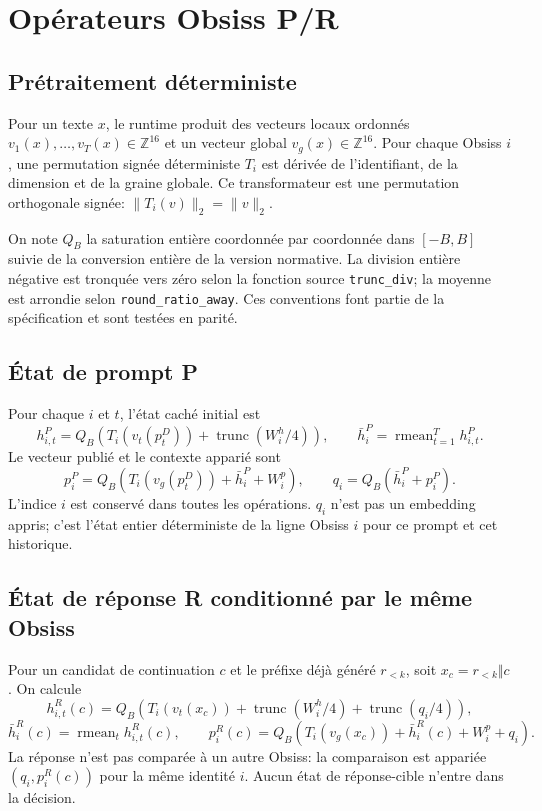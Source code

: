 \documentclass[11pt,a4paper]{report}
\begin{document}
\chapter{Opérateurs Obsiss P/R}
\section{Prétraitement déterministe}
Pour un texte $x$, le runtime produit des vecteurs locaux ordonnés $v_1(x),\ldots,v_T(x)\in\mathbb Z^{16}$ et un vecteur global $v_g(x)\in\mathbb Z^{16}$. Pour chaque Obsiss $i$, une permutation signée déterministe $T_i$ est dérivée de l'identifiant, de la dimension et de la graine globale. Ce transformateur est une permutation orthogonale signée: $\|T_i(v)\|_2=\|v\|_2$.

On note $Q_B$ la saturation entière coordonnée par coordonnée dans $[-B,B]$ suivie de la conversion entière de la version normative. La division entière négative est tronquée vers zéro selon la fonction source \texttt{trunc\_div}; la moyenne est arrondie selon \texttt{round\_ratio\_away}. Ces conventions font partie de la spécification et sont testées en parité.

\section{État de prompt P}
Pour chaque $i$ et $t$, l'état caché initial est
\[
 h^P_{i,t}=Q_B\!\left(T_i(v_t(p_t^D))+\operatorname{trunc}(W_i^h/4)\right),
\qquad \bar h_i^P=\operatorname{rmean}_{t=1}^{T}h^P_{i,t}.
\]
Le vecteur publié et le contexte apparié sont
\[
 p_i^P=Q_B\!\left(T_i(v_g(p_t^D))+\bar h_i^P+W_i^p\right),\qquad
 q_i=Q_B(\bar h_i^P+p_i^P).
\]
L'indice $i$ est conservé dans toutes les opérations. $q_i$ n'est pas un embedding appris; c'est l'état entier déterministe de la ligne Obsiss $i$ pour ce prompt et cet historique.

\section{État de réponse R conditionné par le même Obsiss}
Pour un candidat de continuation $c$ et le préfixe déjà généré $r_{<k}$, soit $x_c=r_{<k}\Vert c$. On calcule
\[
 h^R_{i,t}(c)=Q_B\!\left(T_i(v_t(x_c))+\operatorname{trunc}(W_i^h/4)+\operatorname{trunc}(q_i/4)\right),
\]
\[
 \bar h_i^R(c)=\operatorname{rmean}_{t}h^R_{i,t}(c),\qquad
 p_i^R(c)=Q_B\!\left(T_i(v_g(x_c))+\bar h_i^R(c)+W_i^p+q_i\right).
\]
La réponse n'est pas comparée à un autre Obsiss: la comparaison est appariée $(q_i,p_i^R(c))$ pour la même identité $i$. Aucun état de réponse-cible n'entre dans la décision.
\end{document}
